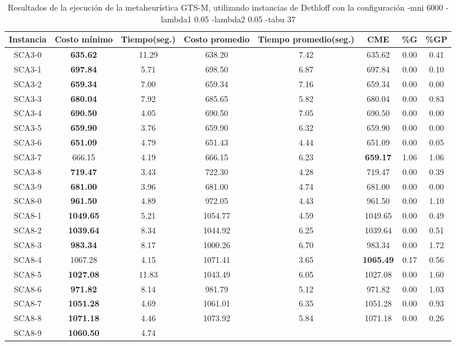 \begin{table}[h]
\caption{Resultados de la ejecución de la metaheurística GTS-M, utilizando instancias de Dethloff con la configuración -mni 6000 -lambda1 0.05 -lambda2 0.05 -tabu 37}
\centering
\small
\begin{tabular}{c c c c c c c c}
\hline\hline
Instancia & Costo mínimo & Tiempo(seg.) & Costo promedio & Tiempo promedio(seg.) & CME & \%G & \%GP \\ [0.5ex]
\hline
SCA3-0 & \bf{635.62} & 11.29 & 
638.20 & 7.42 & 635.62 & 0.00
 & 0.41\\SCA3-1 & \bf{697.84} & 5.71 & 
698.50 & 6.87 & 697.84 & 0.00
 & 0.10\\SCA3-2 & \bf{659.34} & 7.00 & 
659.34 & 7.16 & 659.34 & 0.00
 & 0.00\\
SCA3-3 & \bf{680.04} & 7.92 & 
685.65 & 5.82 & 680.04 & 0.00
 & 0.83\\SCA3-4 & \bf{690.50} & 4.05 & 
690.50 & 7.05 & 690.50 & 0.00
 & 0.00\\
SCA3-5 & \bf{659.90} & 3.76 & 
659.90 & 6.32 & 659.90 & 0.00
 & 0.00\\
SCA3-6 & \bf{651.09} & 4.79 & 
651.43 & 4.44 & 651.09 & 0.00
 & 0.05\\SCA3-7 & 666.15 & 4.19 & 
666.15 & 6.23 & \bf{659.17} & 
1.06 & 1.06\\SCA3-8 & \bf{719.47} & 3.43 & 
722.30 & 4.28 & 719.47 & 0.00
 & 0.39\\SCA3-9 & \bf{681.00} & 3.96 & 
681.00 & 4.74 & 681.00 & 0.00
 & 0.00\\
SCA8-0 & \bf{961.50} & 4.89 & 
972.05 & 4.43 & 961.50 & 0.00
 & 1.10\\SCA8-1 & \bf{1049.65} & 5.21 & 
1054.77 & 4.59 & 1049.65 & 0.00
 & 0.49\\SCA8-2 & \bf{1039.64} & 8.34 & 
1044.92 & 6.25 & 1039.64 & 0.00
 & 0.51\\SCA8-3 & \bf{983.34} & 8.17 & 
1000.26 & 6.70 & 983.34 & 0.00
 & 1.72\\SCA8-4 & 1067.28 & 4.15 & 
1071.41 & 3.65 & \bf{1065.49} & 
0.17 & 0.56\\SCA8-5 & \bf{1027.08} & 11.83 & 
1043.49 & 6.05 & 1027.08 & 0.00
 & 1.60\\SCA8-6 & \bf{971.82} & 8.14 & 
981.79 & 5.12 & 971.82 & 0.00
 & 1.03\\SCA8-7 & \bf{1051.28} & 4.69 & 
1061.01 & 6.35 & 1051.28 & 0.00
 & 0.93\\SCA8-8 & \bf{1071.18} & 4.46 & 
1073.92 & 5.84 & 1071.18 & 0.00
 & 0.26\\SCA8-9 & \bf{1060.50} & 4.74 & 

\end{tabular}
\end{table}
